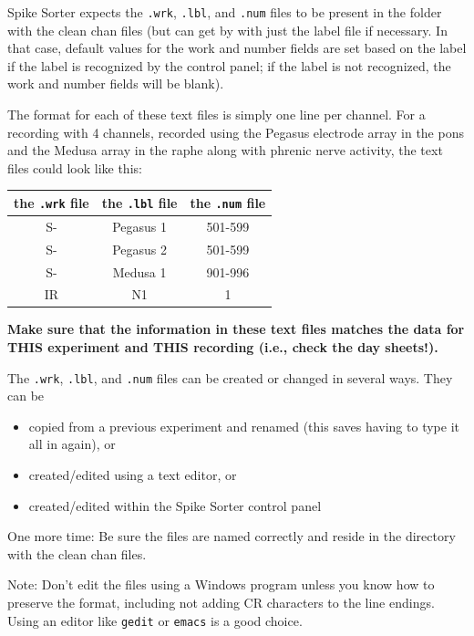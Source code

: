 \documentclass[12pt]{article}
\begin{document}
Spike Sorter expects the {\tt .wrk}, {\tt .lbl}, and {\tt .num} files
to be present in the folder with the clean chan files (but can get by
with just the label file if necessary. In that case, default values
for the work and number fields are set based on the label if the label
is recognized by the control panel; if the label is not recognized,
the work and number fields will be blank).

The format for each of these text files is simply one line per
channel. For a recording with 4 channels, recorded using the Pegasus
electrode array in the pons and the Medusa array in the raphe along
with phrenic nerve activity, the text files could look like this:
\begin{center}
\begin{tabular}{|c|c|c|}
\hline
{ the {\tt .wrk} file} & { the {\tt .lbl} file} & { the {\tt .num} file}\\
\hline
\hline
{ S-} & { Pegasus 1} & { 501-599}\\
\hline
{ S-} & { Pegasus 2} & { 501-599}\\
\hline
{ S-} & { Medusa 1} & { 901-996}\\
\hline
{ IR} & { N1} & { 1}\\
\hline
\end{tabular}
\end{center}

{\bfseries Make sure that the information in these text files matches
  the data for THIS experiment and THIS recording (i.e., check the day
  sheets!).}

The {\tt .wrk}, {\tt .lbl}, and {\tt .num} files can be created or
changed in several ways. They can be
\begin{itemize}
\item copied from a previous experiment and renamed (this saves having
  to type it all in again), or
\item created/edited using a text editor, or
\item created/edited within the Spike Sorter control panel
\end{itemize}

One more time: Be sure the files are named correctly and reside in the
directory with the clean chan files.

Note: Don't edit the files using a Windows program unless you know how
to preserve the format, including not adding CR characters to the line
endings. Using an editor like {\tt gedit} or {\tt emacs} is a good
choice.
\end{document}
